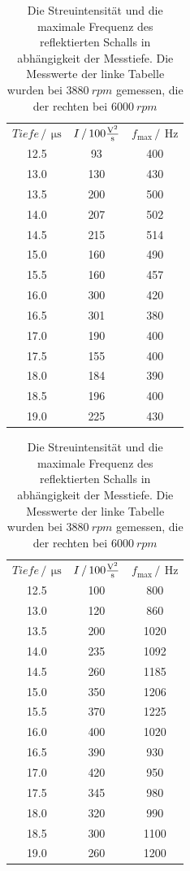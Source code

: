\begin{table}
    \centering
    \begin{tabular}[t]{ccc}
    \toprule
    $Tiefe \,/\, \SI{}{\micro\second}$ & $I \,/\, \SI{}{100\frac{\volt^2}{\second}} $ & $f_\text{max}\,/\, \SI{}{\Hz} $\\
    12.5 & 93 & 400     \\
    13.0 & 130 & 430    \\
    13.5 & 200 & 500    \\
    14.0 & 207 & 502    \\
    14.5 & 215 & 514    \\
    15.0 & 160 & 490    \\
    15.5 & 160 & 457    \\
    16.0 & 300 & 420    \\
    16.5 & 301 & 380    \\
    17.0 & 190 & 400    \\
    17.5 & 155 & 400    \\
    18.0 & 184 & 390    \\
    18.5 & 196 & 400    \\
    19.0 & 225 & 430    \\
    \bottomrule
    \end{tabular}
    \begin{tabular}[t]{ccc}
    \toprule
    $Tiefe \,/\, \SI{}{\micro\second}$ & $I \,/\, \SI{}{100\frac{\volt ^2}{\second}} $ & $f_\text{max}\,/\, \SI{}{\Hz} $\\
    12.5 & 100 & 800        \\
    13.0 & 120 & 860        \\
    13.5 & 200 & 1020       \\
    14.0 & 235 & 1092       \\
    14.5 & 260 & 1185       \\
    15.0 & 350 & 1206       \\
    15.5 & 370 & 1225       \\
    16.0 & 400 & 1020       \\
    16.5 & 390 & 930        \\
    17.0 & 420 & 950        \\
    17.5 & 345 & 980        \\
    18.0 & 320 & 990        \\
    18.5 & 300 & 1100       \\
    19.0 & 260 & 1200       \\
    \bottomrule
    \end{tabular}
    \caption{Die Streuintensität und die maximale Frequenz des reflektierten Schalls in abhängigkeit der Messtiefe. Die Messwerte der linke Tabelle wurden bei $\SI{3880}{rpm}$ gemessen, die der rechten bei $\SI{6000}{rpm}$}
    \label{tab:depth}
\end{table}


